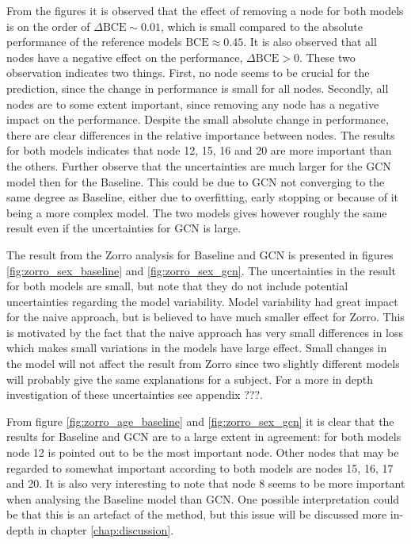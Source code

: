From the figures it is observed that the effect of removing a node for both models is on the order of $\Delta \text{BCE} \sim 0.01$, which is small compared to the absolute performance of the reference models $\text{BCE} \approx 0.45$. It is also observed that all nodes have a negative effect on the performance, $\Delta\text{BCE}>0$. These two observation indicates two things. First, no node seems to be crucial for the prediction, since the change in performance is small for all nodes. Secondly, all nodes are to some extent important, since removing any node has a negative impact on the performance. Despite the small absolute change in performance, there are clear differences in the relative importance between nodes. The results for both models indicates that node 12, 15, 16 and 20 are more important than the others. Further observe that the uncertainties are much larger for the GCN model then for the Baseline. This could be due to GCN not converging to the same degree as Baseline, either due to overfitting, early stopping or because of it being a more complex model. The two models gives however roughly the same result even if the uncertainties for GCN is large. 

The result from the Zorro analysis for Baseline and GCN is presented in figures \ref{fig:zorro_sex_baseline} and \ref{fig:zorro_sex_gcn}. The uncertainties in the result for both models are small, but note that they do not include potential uncertainties regarding the model variability. Model variability had great impact for the naive approach, but is believed to have much smaller effect for Zorro. This is motivated by the fact that the naive approach has very small differences in loss which makes small variations in the models have large effect. Small changes in the model will not affect the result from Zorro since two slightly different models will probably give the same explanations for a subject. For a more in depth investigation of these uncertainties see appendix ???. 

From figure \ref{fig:zorro_age_baseline} and \ref{fig:zorro_sex_gcn} it is clear that the results for Baseline and GCN are to a large extent in agreement: for both models node 12 is pointed out to be the most important node. Other nodes that may be regarded to somewhat important according to both models are nodes 15, 16, 17 and 20. It is also very interesting to note that node 8 seems to be more important when analysing the Baseline model than GCN. One possible interpretation could be that this is an artefact of the method, but this issue will be discussed more in-depth in chapter \ref{chap:discussion}. 

